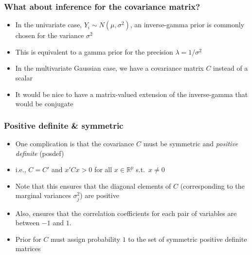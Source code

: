 \documentclass[handout]{beamer}
\begin{document}
\begin{frame}
\frametitle{What about inference for the covariance matrix?}
\begin{itemize}[<+-| alert@+>]
\item In the univariate case, $Y_i \sim N(\mu,\sigma^2)$, an inverse-gamma prior is commonly 
chosen for the variance $\sigma^2$

\item This is equivalent to a gamma prior for the precision $\lambda = 1/\sigma^{2}$

\item In the multivariate Gaussian case, we have a covariance matrix $C$ instead of a
scalar

\item It would be nice to have a matrix-valued extension of the inverse-gamma that would be conjugate
\end{itemize}
\end{frame}

\begin{frame}
\frametitle{Positive definite \& symmetric}
\begin{itemize}[<+-| alert@+>]
\item One complication is that the covariance $C$ must be symmetric and {\em positive definite} (posdef)

\item i.e., $C=C'$ and $x' C x > 0$ for all $x \in \mathbb{R}^p$ s.t.\ $x\neq 0$

\item Note that this ensures that the diagonal elements of $C$ (corresponding to the marginal variances $\sigma_j^2$) 
are positive

\item Also, ensures that the correlation coefficients for each pair of variables are between $-1$ and $1$.

\item Prior for $C$ must assign probability $1$ to the set of symmetric positive definite matrices
\end{itemize}
\end{frame}
\end{document}
